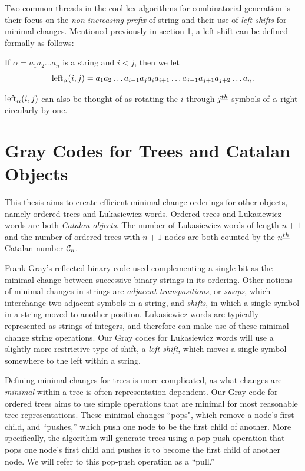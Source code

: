 Two common threads in the cool-lex algorithms for combinatorial generation is their focus on the \emph{non-increasing prefix} of string and their use of \emph{left-shifts} for minimal changes.  Mentioned previously in section \ref{sec:intro_Graycodes}, a left shift can be defined formally as follows:

If $\alpha = a_1 a_2 \ldots a_n$ is a string and $i < j$, then we let
\begin{equation}
    \lshiftindex[\alpha]{i}{j} = a_1 a_2 \ldots a_{i-1} a_j a_{i} a_{i+1} \ldots a_{j-1} a_{j+1} a_{j+2} \ldots a_n. \label{eq:leftdef}
\end{equation}

$\lshiftindex[\alpha]{i}{j}$ can also be thought of as rotating the $i$ through $j\thh$ symbols of $\alpha$ right circularly by one.

\section{Gray Codes for Trees and Catalan Objects} \label{sec:intro_Graycodes}

This thesis aims to create efficient minimal change orderings for other objects, namely ordered trees and Lukasiewicz words.  Ordered trees and Lukasiewicz words are both \emph{Catalan objects}.  The number of Lukasiewicz words of length $n+1$ and the number of ordered trees with $n+1$ nodes are both counted by the $n\thh$ Catalan number $\C_n$.  

Frank Gray's reflected binary code used complementing a single bit as the minimal change between successive binary strings in its ordering.  Other notions of minimal changes in strings are \emph{adjacent-transpositions}, or \emph{swaps}, which interchange two adjacent symbols in a string, and \emph{shifts}, in which a single symbol in a string moved to another position. Lukasiewicz words are typically represented as strings of integers, and therefore can make use of these minimal change string operations.  Our Gray codes for Lukasiewicz words will use a slightly more restrictive type of shift, a \emph{left-shift}, which moves a single symbol somewhere to the left within a string. 




Defining minimal changes for trees is more complicated, as what changes are \emph{minimal} within a tree is often representation dependent.  Our Gray code for ordered trees aims to use simple operations that are minimal for most reasonable tree representations.  These minimal changes ``pops", which remove a node's first child, and ``pushes,'' which push one node to be the first child of another.  More specifically, the algorithm will generate trees using a pop-push operation that pops one node's first child and pushes it to become the first child of another node.  We will refer to this pop-push operation as a ``pull.''

